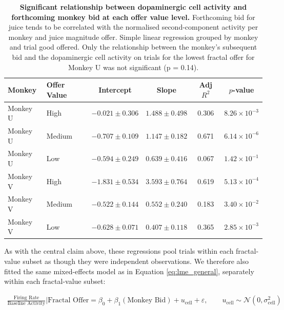 \begin{table}[htbp]
\centering
\begin{tabular}{llcccc}
\hline
\textbf{Monkey }& \textbf{Offer Value} & \textbf{Intercept} & \textbf{Slope} & \textbf{Adj} $R^2$ & $p$\textbf{-value} \\
\hline
Monkey U & High & $-0.021 \pm 0.306$ & $1.488 \pm 0.498$ & 0.306 & $8.26 \times 10^{-3}$ \\
Monkey U & Medium & $-0.707 \pm 0.109$ & $1.147 \pm 0.182$ & 0.671 & $6.14 \times 10^{-6}$ \\
Monkey U & Low & $-0.594 \pm 0.249$ & $0.639 \pm 0.416$ & 0.067 & $1.42 \times 10^{-1}$ \\
\hline
Monkey V & High & $-1.831 \pm 0.534$ & $3.593 \pm 0.764$ & 0.619 & $5.13 \times 10^{-4}$ \\
Monkey V & Medium & $-0.522 \pm 0.144$ & $0.552 \pm 0.240$ & 0.183 & $3.40 \times 10^{-2}$ \\
Monkey V & Low & $-0.628 \pm 0.071$ & $0.407 \pm 0.118$ & 0.365 & $2.85 \times 10^{-3}$ \\
\hline
\end{tabular}
\caption[Significant relationship between dopaminergic cell activity and forthcoming monkey bid at each offer value level.]{\textbf{Significant relationship between dopaminergic cell activity and forthcoming monkey bid at each offer value level.} Forthcoming bid for juice tends to be correlated with the normalised second-component activity per monkey and juice magnitude offer. Simple linear regression grouped by monkey and trial good offered. Only the relationship between the monkey's subsequent bid and the dopaminergic cell activity on trials for the lowest fractal offer for Monkey U was not significant (p = 0.14).}
\label{tab:fd_regression_split_fractal}
\end{table}

As with the central claim above, these regressions pool trials within each fractal-value subset as though they were independent observations. We therefore also fitted the same mixed-effects model as in Equation \ref{eq:lme_general}, separately within each fractal-value subset:

\begin{align}
\frac{\text{Firing Rate}}{\text{Baseline Activity}} \Big| \text{Fractal Offer} = \beta_0 + \beta_1(\text{Monkey Bid}) + u_{\text{cell}} + \varepsilon, \qquad u_{\text{cell}} \sim \mathcal{N}(0, \sigma^2_{\text{cell}}) \label{eq:lme_fractal}
\end{align}

